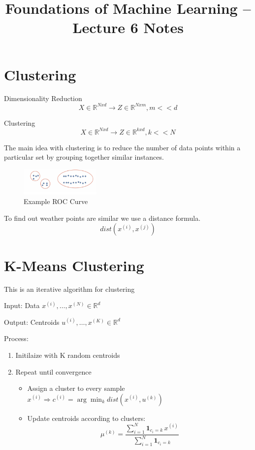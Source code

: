 \documentclass[11pt]{article}
\title{Foundations of Machine Learning -- Lecture 6 Notes}
\author{}
\date{}
\begin{document}
\maketitle

\section*{Clustering}

Dimensionality Reduction
\[
	X \in \mathbb{R}^{Nxd} \rightarrow Z \in \mathbb{R}^{Nxm}, m << d
\]

Clustering
\[
	X \in \mathbb{R}^{Nxd} \rightarrow Z \in \mathbb{R}^{kxd}, k << N
\]

The main idea with clustering is to reduce the number of data points within a particular set by grouping together similar instances.

\begin{figure}[h]
	\centering
	\includegraphics[width=0.35\textwidth]{../imgs/clust-exam.png} %
	\caption{Example ROC Curve}
\end{figure}

To find out weather points are similar we use a distance formula.
\[
	dist(x^{(i)}, x^{(j)})
\]

\section*{K-Means Clustering}

This is an iterative algorithm for clustering
\medskip

Input: Data ${x^{(i)},\dots,x^{(N)} \in \mathbb{R}^d}$
\medskip

Output: Centroids ${u^{(i)},\dots,x^{(K)} \in \mathbb{R}^d}$
\medskip

Process:
\begin{enumerate}
	\item Initilaize with K random centroids
	\item Repeat until convergence
	      \begin{itemize}
		      \item Assign a cluster to every sample $x^{(i)} \Rightarrow c^{(i)} = \arg\min_k dist(x^{(i)}, u^{(k)})$
		      \item Update centroids according to clusters: \[
			            \mu^{(k)} =
			            \frac{\displaystyle \sum_{i=1}^{N} \mathbf{1}_{c_i = k} \, x^{(i)}}
			            {\displaystyle \sum_{i=1}^{N} \mathbf{1}_{c_i = k}}
		            \]

	      \end{itemize}
\end{enumerate}
\end{document}
